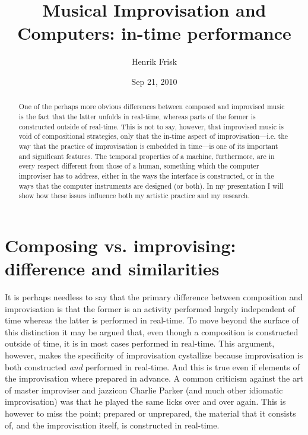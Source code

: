 \documentclass{article}
\begin{document}
\title{Musical Improvisation and Computers: in-time performance}
\author{Henrik Frisk}
\date{Sep 21, 2010}

\maketitle




\begin{abstract}
  One of the perhaps more obvious differences between composed and improvised
  music is the fact that the latter unfolds in real-time, whereas parts of the
  former is constructed outside of real-time. This is not to say, however,
  that improvised music is void of compositional strategies, only that the
  in-time aspect of improvisation---i.e. the way that the practice of
  improvisation is embedded in time---is one of its important and significant
  features. The temporal properties of a machine, furthermore, are in every
  respect different from those of a human, something which the computer
  improviser has to address, either in the ways the interface is constructed,
  or in the ways that the computer instruments are designed (or both). In my
  presentation I will show how these issues influence both my artistic
  practice and my research.
\end{abstract}


\section{Composing vs. improvising: difference and similarities}
\label{sec:comp-vs.-impr}

It is perhaps needless to say that the primary difference between composition and improvisation is that the former is an activity performed largely independent of time whereas the latter is performed in real-time. To move beyond the surface of this distinction it may be argued that, even though a composition is constructed outside of time, it is in most cases performed in real-time. This argument, however, makes the specificity of improvisation cystallize because improvisation is both constructed \emph{and} performed in real-time. And this is true even if elements of the improvisation where prepared in advance. A common criticism against the art of master improviser and jazzicon Charlie Parker (and much other idiomatic improvisation) was that he played the same licks over and over again. This is however to miss the point; prepared or unprepared, the material that it consists of, and the improvisation itself, is constructed in real-time.
\end{document}
